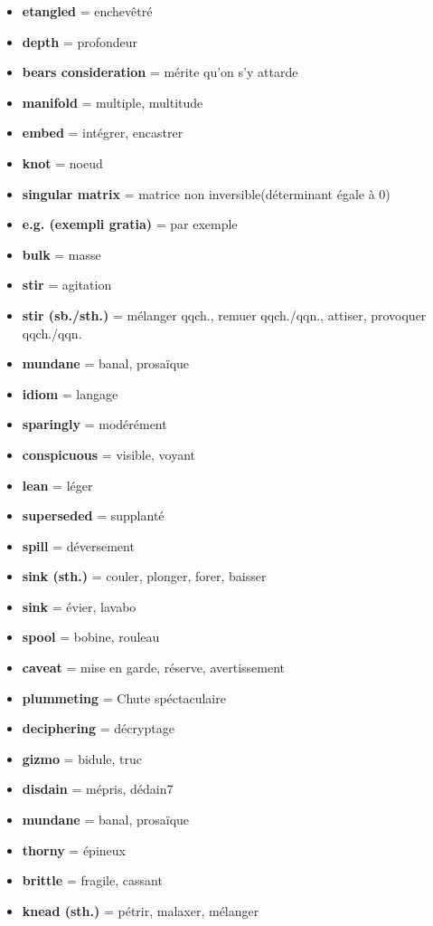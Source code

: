 \documentclass[french]{article}
\begin{document}
\begin{itemize}[label=\textbullet]
	\item \textbf{etangled} = enchevêtré
	\item \textbf{depth} = profondeur
	\item \textbf{bears consideration} = mérite qu'on s'y attarde
	\item \textbf{manifold} = multiple, multitude
	\item \textbf{embed} = intégrer, encastrer
	\item \textbf{knot} = noeud
	\item \textbf{singular matrix} = matrice non inversible(déterminant égale à 0)
	\item \textbf{e.g. (exempli gratia)} = par exemple
	\item \textbf{bulk} = masse
	\item \textbf{stir} = agitation
	\item \textbf{stir (sb./sth.)} = mélanger qqch., remuer qqch./qqn., attiser, provoquer qqch./qqn.
	\item \textbf{mundane} = banal, prosaïque
	\item \textbf{idiom} = langage
	\item \textbf{sparingly} = modérément 
	\item \textbf{conspicuous} = visible, voyant
	\item \textbf{lean} = léger
	\item \textbf{superseded} = supplanté
	\item \textbf{spill} = déversement
	\item \textbf{sink (sth.)} = couler, plonger, forer, baisser
	\item \textbf{sink} = évier, lavabo
	\item \textbf{spool} = bobine, rouleau
	\item \textbf{caveat} = mise en garde, réserve, avertissement
	\item \textbf{plummeting} = Chute spéctaculaire
	\item \textbf{deciphering} = décryptage
	\item \textbf{gizmo} = bidule, truc
	\item \textbf{disdain} = mépris, dédain7
	\item \textbf{mundane} = banal, prosaïque
	\item \textbf{thorny} = épineux
	\item \textbf{brittle} = fragile, cassant
	\item \textbf{knead (sth.)} = pétrir, malaxer, mélanger
	\\
\end{itemize}
\end{document}
